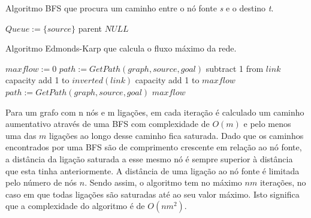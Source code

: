 \documentclass[12pt,a4paper]{article}
\begin{document}
\begin{algorithm}
\caption{Algoritmo BFS que procura um caminho entre o nó fonte \textit{s} e o destino \textit{t}.}\label{alg:bfs_goal}
\begin{algorithmic}[1]
    \EndFor
    \State $Queue :=  \{source\}$
      		\Return parent 
      \EndIf
            \EndIf
      \EndFor
  	\EndWhile
  	\Return $NULL$
\EndProcedure
\end{algorithmic}
\end{algorithm}

\begin{algorithm}
\caption{Algoritmo Edmonds-Karp que calcula o fluxo máximo da rede.}\label{alg:residual_network}
\begin{algorithmic}[1]
    \State $maxflow := 0 $
    \State $path := GetPath(graph,source,goal)$
      		\State subtract 1 from $link$ capacity
        	\State add 1 to $inverted(link)$ capacity
      \EndFor
      \State add 1 to $maxflow$
      \State $path := GetPath(graph,source,goal)$
  	\EndWhile
  	\Return $maxflow$
\EndProcedure
\end{algorithmic}
\end{algorithm}

Para um grafo com n nós e m ligações, em cada iteração é calculado um caminho aumentativo através de uma BFS com complexidade de $O(m)$ e pelo menos uma das $m$ ligações ao longo desse caminho fica saturada. Dado que os caminhos encontrados por uma BFS são de comprimento crescente em relação ao nó fonte, a distância da ligação saturada a esse mesmo nó é sempre superior à distância que esta tinha anteriormente. A distância de uma ligação ao nó fonte é limitada pelo número de nós $n$. Sendo assim, o algoritmo tem no máximo $nm$ iterações, no caso em que todas ligações são saturadas até ao seu valor máximo. Isto significa que a complexidade do algoritmo é de $O(nm^2)$.
\end{document}
